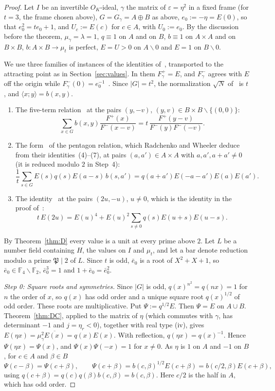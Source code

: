 \documentclass[11pt]{amsart}
\numberwithin{equation}{section}
\theoremstyle{plain}
\theoremstyle{definition}
\theoremstyle{remark}
\begin{document}
\begin{proof}
Let \(I\) be an invertible \(O_K\)-ideal, \(\gamma\) the matrix of \(\varepsilon=\eta^2\) in a fixed frame (for \(t=3\), the frame chosen above), \(G=G_\gamma=A\oplus B\) as above, \(e_0:=-\eta=E(0)\), so that \(e_0^2=te_0+1\), and \(U_c:=E(c)\) for \(c\in A\), with \(U_0:=e_0\). By the discussion before the theorem, \(\mu_\gamma=\lambda=1\), \(q\equiv1\) on \(A\) and on \(B\), \(b\equiv1\) on \(A\times A\) and on \(B\times B\), \(b:A\times B\to\mu_t\) is perfect, \(E=U>0\) on \(A\smallsetminus0\) and \(E=1\) on \(B\smallsetminus0\).

We use three families of instances of the identities of~\cite{RW}, transported to the attracting point as in Section~\ref{sec:values}. In them \(F^+_\gamma=E\), and \(F^-_\gamma\) agrees with \(E\) off the origin while \(F^-_\gamma(0)=e_0^{-1}\)~\cite[(2), (4)]{RW}. Since \(|G|=t^2\), the normalization \(\sqrt N\) of~\cite{RW} is \(t\), and \(\langle x;y\rangle=b(x,y)\).
\begin{enumerate}
\item[(i)] The five-term relation~\cite[(7)]{RW} at the pairs \((y,-v)\), \((y,v)\in B\times B\smallsetminus\{(0,0)\}\):
\[\sum_{x\in G}b(x,y)\frac{F^+(x)}{F^-(x-v)}=t\,\frac{F^+(y-v)}{F^-(y)F^-(-v)}.\]
\item[(ii)] The form~\cite[(36)]{RW} of the pentagon relation, which Radchenko and Wheeler deduce from their identities~(4)--(7), at pairs \((a,a')\in A\times A\) with \(a,a',a+a'\ne0\) (it is reduced modulo \(2\) in Step~4):
\[\frac1t\sum_{s\in G}E(s)q(s)E(a-s)\,b(s,a')=q(a+a')E(-a-a')E(a)E(a').\]
\item[(iii)] The identity~\cite[(36)]{RW} at the pairs \((2u,-u)\), \(u\ne0\), which is the identity in the proof of~\cite[Thm.~10]{RW}:
\[t\,E(2u)=E(u)^4+E(u)^2\sum_{s\ne0}q(s)E(u+s)E(u-s).\]
\end{enumerate}
By Theorem~\ref{thm:D} every value is a unit at every prime above \(2\). Let \(L\) be a number field containing \(H\), the values on \(I\) and \(\mu_t\), and let a bar denote reduction modulo a prime \(\mathfrak P\mid2\) of \(L\). Since \(t\) is odd, \(\bar e_0\) is a root of \(X^2+X+1\), so \(\bar e_0\in\mathbb F_4\smallsetminus\mathbb F_2\), \(\bar e_0^3=1\) and \(1+\bar e_0=\bar e_0^2\).

\emph{Step 0: Square roots and symmetries.} Since \(|G|\) is odd, \(q(x)^{n^2}=q(nx)=1\) for \(n\) the order of \(x\), so \(q(x)\) has odd order and a unique square root \(q(x)^{1/2}\) of odd order. These roots are multiplicative. Put \(\Psi:=q^{1/2}E\). Then \(\Psi=E\) on \(A\cup B\). Theorem~\ref{thm:DC}, applied to the matrix of \(\eta\) (which commutes with \(\gamma\), has determinant \(-1\) and \(j=\eta_r<0\)), together with real type (iv), gives \(E(\eta x)=\mu_\gamma^2\overline{E(x)}=q(x)E(x)\). With reflection, \(q(\eta x)=q(x)^{-1}\). Hence \(\Psi(\eta x)=\Psi(x)\), and \(\Psi(x)\Psi(-x)=1\) for \(x\ne0\). As \(\eta\) is \(1\) on \(A\) and \(-1\) on \(B\), for \(c\in A\) and \(\beta\in B\)
\[\Psi(c-\beta)=\Psi(c+\beta),\qquad \Psi(c+\beta)=b(c,\beta)^{1/2}E(c+\beta)=b(c/2,\beta)E(c+\beta),\]
using \(q(c+\beta)=q(c)q(\beta)b(c,\beta)=b(c,\beta)\). Here \(c/2\) is the half in \(A\), which has odd order.


\end{proof}
\end{document}
